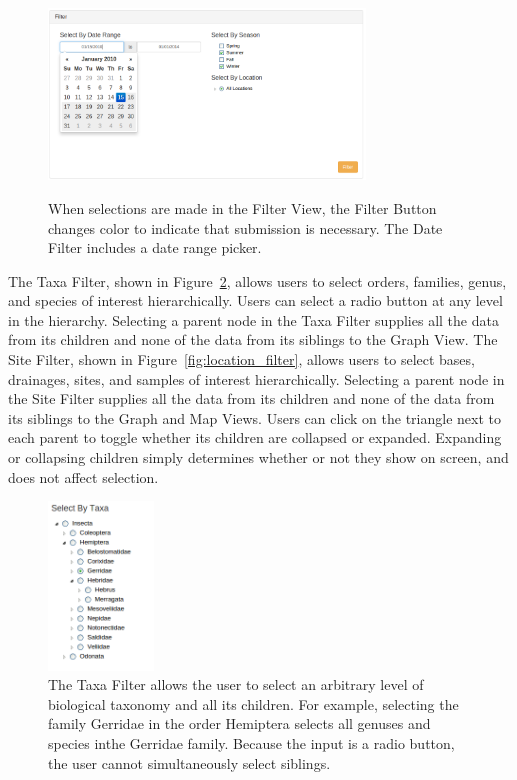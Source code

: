\documentclass[10pt,draftclsnofoot,onecolumn]{IEEEtran}
\begin{document}
\begin{figure}[h]
\centering
\includegraphics[width=0.75\textwidth]{images/date_filter.png}
\label{fig:date_filter}
\captionsetup{justification=centering}
\caption{
  When selections are made in the Filter View, the Filter Button changes color to indicate that submission is necessary.
  The Date Filter includes a date range picker.
}
\end{figure}

The Taxa Filter, shown in Figure~\ref{fig:taxa_filter}, allows users to select orders, families, genus, and species of interest hierarchically.
Users can select a radio button at any level in the hierarchy.
Selecting a parent node in the Taxa Filter supplies all the data from its children and none of the data from its siblings to the Graph View.
The Site Filter, shown in Figure~\ref{fig:location_filter}, allows users to select bases, drainages, sites, and samples of interest hierarchically.
Selecting a parent node in the Site Filter supplies all the data from its children and none of the data from its siblings to the Graph and Map Views.
Users can click on the triangle next to each parent to toggle whether its children are collapsed or expanded.
Expanding or collapsing children simply determines whether or not they show on screen, and does not affect selection.

\begin{figure}[h]
\centering
\includegraphics[width=0.25\textwidth]{images/taxa_filter.png}
\captionsetup{justification=centering}
\caption{
  The Taxa Filter allows the user to select an arbitrary level of biological taxonomy and all its children.
  For example, selecting the family Gerridae in the order Hemiptera selects all genuses and species inthe Gerridae family.
  Because the input is a radio button, the user cannot simultaneously select siblings.
}
\label{fig:taxa_filter}
\end{figure}
\end{document}
